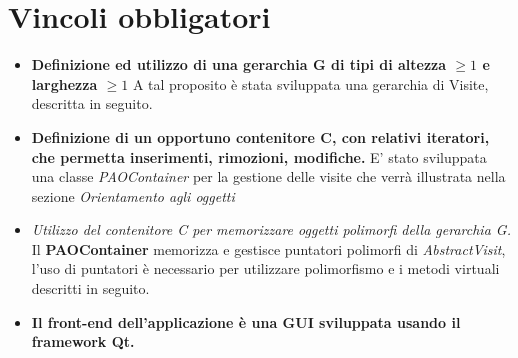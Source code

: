 \section{Vincoli obbligatori}
\begin{itemize}
\item \textbf{Definizione ed utilizzo di una gerarchia G di tipi di altezza $\geq 1$ e larghezza $\geq 1$} A tal proposito è stata sviluppata una gerarchia di Visite, descritta in seguito.
\item \textbf{ Definizione di un opportuno contenitore C, con relativi iteratori, che permetta inserimenti, rimozioni, modifiche.} E' stato sviluppata una classe \textit{PAOContainer} per la gestione delle visite che verrà illustrata nella sezione \textit{Orientamento agli oggetti}
\item \textit{Utilizzo del contenitore C per memorizzare oggetti polimorfi della gerarchia G.} Il \textbf{PAOContainer} memorizza e gestisce puntatori polimorfi di \textit{AbstractVisit}, l'uso di puntatori è necessario per utilizzare polimorfismo e i metodi virtuali descritti in seguito.
\item \textbf{Il front-end dell’applicazione è una GUI sviluppata usando il framework Qt.}
\end{itemize}
\